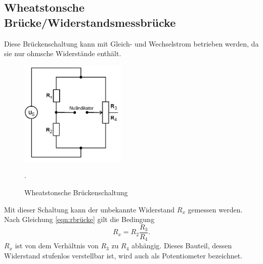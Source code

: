 \subsection{Wheatstonsche Brücke/Widerstandsmessbrücke}
\noindent Diese Brückenschaltung kann mit Gleich- und Wechselstrom betrieben werden,
da sie nur ohmsche Widerstände enthält.
\begin{figure}[H]
  \centering
  \includegraphics[height=5cm]{widerstand.JPG}
  \caption{Wheatstonsche Brückenschaltung}
  \label{fig:widerstand}
  \cite{skript}.
\end{figure}

\noindent Mit dieser Schaltung kann der unbekannte Widerstand $R_{x}$ gemessen werden.
Nach Gleichung \ref{eqn:rbrücke} gilt die Bedingung
\begin{equation}
  R_{x}= R_{2}\frac{R_{3}}{R_{4}}.
  \label{eqn:rx}
\end{equation}
$R_{x}$ ist von dem Verhältnis von $R_{3}$ zu $R_{4}$ abhängig. Dieses Bauteil, dessen
Widerstand stufenlos verstellbar ist, wird auch als Potentiometer bezeichnet.
